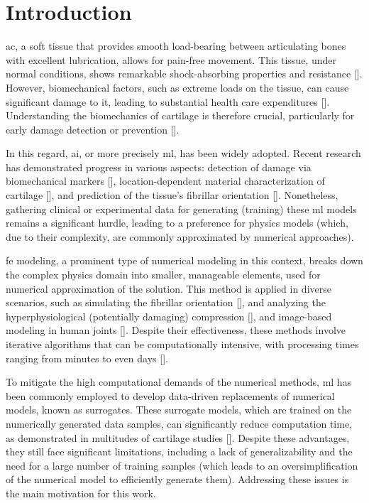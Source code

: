 \listoffigures{}
\newpage

\listoftables{}
\newpage

\acresetall
\chapter{Introduction}

\Ac{ac}, a soft tissue that provides smooth load-bearing between articulating bones with excellent lubrication, allows for pain-free movement. This tissue, under normal conditions, shows remarkable shock-absorbing properties and resistance [\cite{lu2008}]. However, biomechanical factors, such as extreme loads on the tissue, can cause significant damage to it, leading to substantial health care expenditures [\cite{salmon2016}]. Understanding the biomechanics of cartilage is therefore crucial, particularly for early damage detection or prevention [\cite{moreno2019}].

In this regard, \ac{ai}, or more precisely \ac{ml}, has been widely adopted. Recent research has demonstrated progress in various aspects: detection of damage via biomechanical markers [\cite{alunnicardinali2023}], location-dependent material characterization of cartilage [\cite{niasar2023}], and prediction of the tissue's fibrillar orientation [\cite{mirmojarabian2023}]. Nonetheless, gathering clinical or experimental data for generating (training) these \ac{ml} models remains a significant hurdle, leading to a preference for physics models (which, due to their complexity, are commonly approximated by numerical approaches).

\Ac{fe} modeling, a prominent type of numerical modeling in this context, breaks down the complex physics domain into smaller, manageable elements, used for numerical approximation of the solution. This method is applied in diverse scenarios, such as simulating the fibrillar orientation [\cite{sajjadinia2021b}], and analyzing the hyperphysiological (potentially damaging) compression [\cite{occhetta2019}], and image-based modeling in human joints [\cite{thienkarochanakul2020}]. Despite their effectiveness, these methods involve iterative algorithms that can be computationally intensive, with processing times ranging from minutes to even days [\cite{donahue2002,kazemi2011,naghibi2016,wang2018b,lorza2021}].

To mitigate the high computational demands of the numerical methods, \ac{ml} has been commonly employed to develop data-driven replacements of numerical models, known as surrogates. These surrogate models, which are trained on the numerically generated data samples, can significantly reduce computation time, as demonstrated in multitudes of cartilage studies [\cite{paiva2012,arbabi2016a,arbabi2016b,egli2021}]. Despite these advantages, they still face significant limitations, including a lack of generalizability and the need for a large number of training samples (which leads to an oversimplification of the numerical model to efficiently generate them). Addressing these issues is the main motivation for this work.

